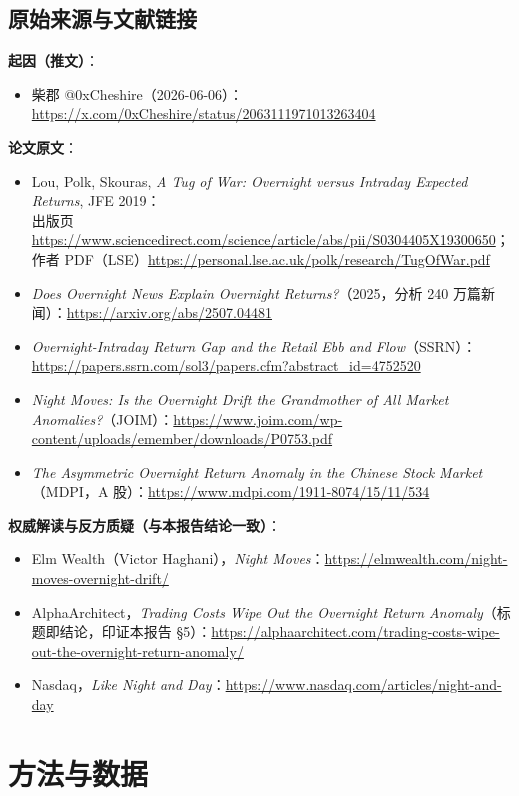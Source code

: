 \documentclass[11pt,a4paper,fontset=none]{ctexart}
\begin{document}
\subsection{原始来源与文献链接}
\textbf{起因（推文）}：
\begin{itemize}\itemsep0pt
  \item 柴郡 @0xCheshire（2026-06-06）：\url{https://x.com/0xCheshire/status/2063111971013263404}
\end{itemize}
\textbf{论文原文}：
\begin{itemize}\itemsep0pt
  \item Lou, Polk, Skouras, \textit{A Tug of War: Overnight versus Intraday Expected Returns}, JFE 2019：\\
        出版页 \url{https://www.sciencedirect.com/science/article/abs/pii/S0304405X19300650}；\\
        作者 PDF（LSE）\url{https://personal.lse.ac.uk/polk/research/TugOfWar.pdf}
  \item \textit{Does Overnight News Explain Overnight Returns?}（2025，分析 240 万篇新闻）：\url{https://arxiv.org/abs/2507.04481}
  \item \textit{Overnight-Intraday Return Gap and the Retail Ebb and Flow}（SSRN）：\url{https://papers.ssrn.com/sol3/papers.cfm?abstract_id=4752520}
  \item \textit{Night Moves: Is the Overnight Drift the Grandmother of All Market Anomalies?}（JOIM）：\url{https://www.joim.com/wp-content/uploads/emember/downloads/P0753.pdf}
  \item \textit{The Asymmetric Overnight Return Anomaly in the Chinese Stock Market}（MDPI，A 股）：\url{https://www.mdpi.com/1911-8074/15/11/534}
\end{itemize}
\textbf{权威解读与反方质疑（与本报告结论一致）}：
\begin{itemize}\itemsep0pt
  \item Elm Wealth（Victor Haghani），\textit{Night Moves}：\url{https://elmwealth.com/night-moves-overnight-drift/}
  \item AlphaArchitect，\textit{Trading Costs Wipe Out the Overnight Return Anomaly}（标题即结论，印证本报告 §5）：\url{https://alphaarchitect.com/trading-costs-wipe-out-the-overnight-return-anomaly/}
  \item Nasdaq，\textit{Like Night and Day}：\url{https://www.nasdaq.com/articles/night-and-day}
\end{itemize}

\section{方法与数据}
\end{document}
